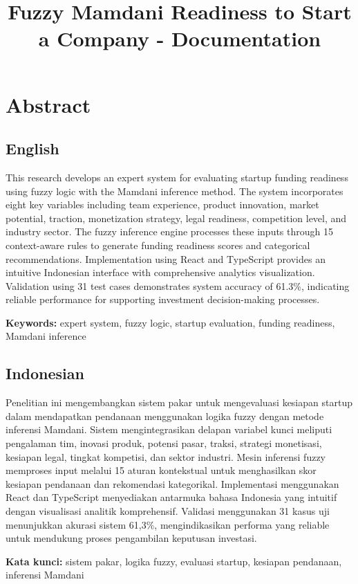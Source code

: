 \documentclass{article}
\title{Fuzzy Mamdani Readiness to Start a Company - Documentation}
\date{}
\begin{document}
\maketitle

\section{Abstract}
\subsection{English}
This research develops an expert system for evaluating startup funding readiness using fuzzy logic with the Mamdani inference method. The system incorporates eight key variables including team experience, product innovation, market potential, traction, monetization strategy, legal readiness, competition level, and industry sector. The fuzzy inference engine processes these inputs through 15 context-aware rules to generate funding readiness scores and categorical recommendations. Implementation using React and TypeScript provides an intuitive Indonesian interface with comprehensive analytics visualization. Validation using 31 test cases demonstrates system accuracy of 61.3\%, indicating reliable performance for supporting investment decision-making processes.

\textbf{Keywords:} expert system, fuzzy logic, startup evaluation, funding readiness, Mamdani inference

\subsection{Indonesian}
Penelitian ini mengembangkan sistem pakar untuk mengevaluasi kesiapan startup dalam mendapatkan pendanaan menggunakan logika fuzzy dengan metode inferensi Mamdani. Sistem mengintegrasikan delapan variabel kunci meliputi pengalaman tim, inovasi produk, potensi pasar, traksi, strategi monetisasi, kesiapan legal, tingkat kompetisi, dan sektor industri. Mesin inferensi fuzzy memproses input melalui 15 aturan kontekstual untuk menghasilkan skor kesiapan pendanaan dan rekomendasi kategorikal. Implementasi menggunakan React dan TypeScript menyediakan antarmuka bahasa Indonesia yang intuitif dengan visualisasi analitik komprehensif. Validasi menggunakan 31 kasus uji menunjukkan akurasi sistem 61,3\%, mengindikasikan performa yang reliable untuk mendukung proses pengambilan keputusan investasi.

\textbf{Kata kunci:} sistem pakar, logika fuzzy, evaluasi startup, kesiapan pendanaan, inferensi Mamdani
\end{document}
